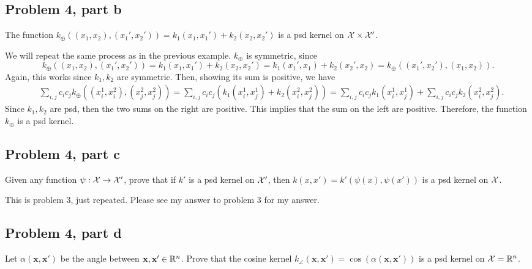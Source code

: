 \newpage
\subsection{Problem 4, part b}
The function $k_\oplus ((x_1, x_2), (x_1', x_2')) = k_1(x_1, x_1') + k_2(x_2, x_2')$ is a psd kernel on $\mathcal{X} \times \mathcal{X}'$.
\partbreak
\begin{solution}

    We will repeat the same process as in the previous example. $k_\oplus$ is symmetric, since
    \[k_\oplus((x_1, x_2), (x_1', x_2')) = k_1(x_1, x_1') + k_2(x_2, x_2') = k_1(x_1', x_1) + k_2(x_2', x_2) = k_\oplus((x_1', x_2'), (x_1, x_2)).\]
    Again, this works since $k_1, k_2$ are symmetric. Then, showing its sum is positive, we have
    \begin{align*}
        &\sum_{i, j}c_ic_jk_\oplus((x_i^1, x_i^2), (x_j^2, x_j^2)) = \sum_{i, j}c_ic_j(k_1(x_i^1, x_j^1) + k_2(x_i^2, x_j^2)) = \sum_{i, j}c_ic_jk_1(x_i^1, x_j^1) + \sum_{i, j} c_ic_jk_2(x_i^2, x_j^2).
    \end{align*}
    Since $k_1, k_2$ are psd, then the two sums on the right are positive. This implies that the sum on the left are positive. Therefore, the function $k_\oplus$ is a psd kernel.
\end{solution}

\newpage
\subsection{Problem 4, part c}
Given any function $\psi: \mathcal{X} \to \mathcal{X}'$, prove that if $k'$ is a psd kernel on $\mathcal{X}'$, then $k(x, x') = k'(\psi(x), \psi(x'))$ is a psd kernel on $\mathcal{X}$.
\partbreak
\begin{solution}

    This is problem 3, just repeated. Please see my answer to problem 3 for my answer. 
\end{solution}

\newpage
\subsection{Problem 4, part d}
Let $\alpha(\textbf{x}, \textbf{x}')$ be the angle between $\textbf{x}, \textbf{x}' \in \mathbb{R}^n$. Prove that the cosine kernel $k_\angle (\textbf{x}, \textbf{x}') = \cos(\alpha(\textbf{x}, \textbf{x}'))$ is a psd kernel on $\mathcal{X} = \mathbb{R}^n$.
\partbreak
\begin{solution}

    
\end{solution}


